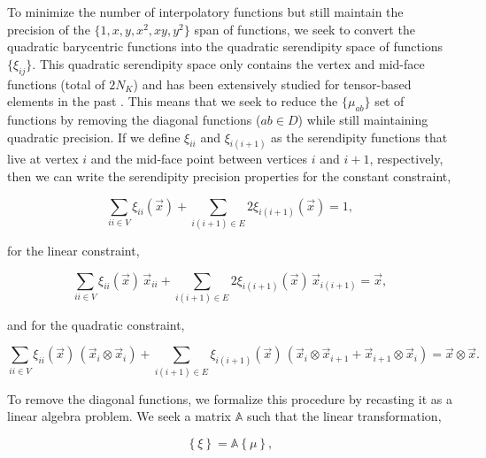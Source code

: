 To minimize the number of interpolatory functions but still maintain the precision of the $\{ 1, x, y, x^2, xy, y^2 \}$ span of functions, we seek to convert the quadratic barycentric functions into the quadratic serendipity space of functions $\{ \xi_{ij} \}$. This quadratic serendipity space only contains the vertex and mid-face functions (total of $2 N_K$) and has been extensively studied for tensor-based elements in the past \cite{macneal1992eight,arnold2011serendipity}. This means that we seek to reduce the $\{ \mu_{ab} \}$ set of functions by removing the diagonal functions ($ab \in D$) while still maintaining quadratic precision. If we define $\xi_{ii}$ and $\xi_{i(i+1)}$ as the serendipity functions that live at vertex $i$ and the mid-face point between vertices $i$ and $i+1$, respectively, then we can write the serendipity precision properties for the constant constraint,

\begin{equation}
\label{eq::BF_ser_interp_req_constant}
\sum_{ii \in V}  \xi_{ii} (\vec{x}) + \sum_{i(i+1) \in E} 2 \xi_{i(i+1)} (\vec{x})  = 1 ,
\end{equation}

\noindent for the linear constraint,

\begin{equation}
\label{eq::BF_ser_interp_req_linear}
\sum_{ii \in V}  \xi_{ii} (\vec{x}) \, \vec{x}_{ii} +  \sum_{i(i+1) \in E} 2  \xi_{i(i+1)} (\vec{x}) \, \vec{x}_{i(i+1)} = \vec{x} ,
\end{equation}

\noindent and for the quadratic constraint,

\begin{equation}
\label{eq::BF_ser_interp_req_quadratic}
\sum_{ii \in V}  \xi_{ii} (\vec{x}) \, \left( \vec{x}_i \otimes \vec{x}_i \right) +  \sum_{i(i+1) \in E}   \xi_{i(i+1)} (\vec{x}) \, \left( \vec{x}_i \otimes \vec{x}_{i+1} + \vec{x}_{i+1} \otimes \vec{x}_i \right)   =  \vec{x} \otimes \vec{x} .
\end{equation}

To remove the diagonal functions, we formalize this procedure by recasting it as a linear algebra problem. We seek a matrix $\mathbb{A}$ such that the linear transformation, 

\begin{equation}
\label{eq::BF_quad_to_ser_mapping}
\left\{ \xi \right\} = \mathbb{A} \left\{ \mu \right\} ,
\end{equation}

